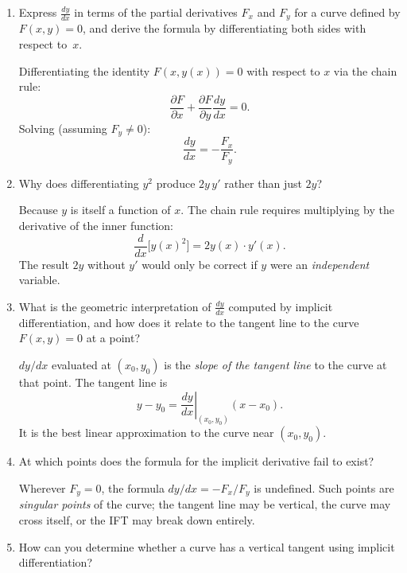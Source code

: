 \documentclass{self-check}
\begin{document}
\begin{enumerate}[leftmargin=*, itemsep=8pt]
    \begin{answer}
      Differentiate both sides with respect to \(x\), treating \(y\) as a function of \(x\):
      \[ 2x + 2y\,\frac{dy}{dx}= 0. \]
      Solving for \(dy/dx\) gives
      \[ \frac{dy}{dx}= -\frac{x}{y}. \]
    \end{answer}
  \item Express \(\frac{dy}{dx}\) in terms of the partial derivatives \(F_{x}\) and \(F_{y}\) for a curve defined by \(F(x,y)=0\), and derive the formula by differentiating both sides with respect to~\(x\).

    \begin{answer}
      Differentiating the identity \(F(x,y(x))=0\) with respect to \(x\) via the chain rule:
      \[ \frac{\partial F}{\partial x}+ \frac{\partial F}{\partial y}\frac{dy}{dx}= 0. \]
      Solving (assuming \(F_{y}\neq 0\)):
      \[ \frac{dy}{dx}= -\frac{F_{x}}{F_{y}}. \]
    \end{answer}
  \item Why does differentiating \(y^{2}\) produce \(2y\,y'\) rather than just \(2y\)?

    \begin{answer}
      Because \(y\) is itself a function of \(x\). The chain rule requires multiplying by the derivative of the inner function:
      \[ \frac{d}{dx}\bigl[y(x)^{2}\bigr] = 2y(x)\cdot y'(x). \]
      The result \(2y\) without \(y'\) would only be correct if \(y\) were an \emph{independent} variable.
    \end{answer}
  \item What is the geometric interpretation of \(\frac{dy}{dx}\) computed by implicit differentiation, and how does it relate to the tangent line to the curve \(F(x,y)=0\) at a point?

    \begin{answer}
      \(dy/dx\) evaluated at \((x_{0},y_{0})\) is the \emph{slope of the tangent line} to the curve at that point. The tangent line is
      \[ y - y_{0} = \left.\frac{dy}{dx}\right|_{(x_{0},y_{0})}(x-x_{0}). \]
      It is the best linear approximation to the curve near \((x_{0},y_{0})\).
    \end{answer}
  \item At which points does the formula for the implicit derivative fail to exist?

    \begin{answer}
      Wherever \(F_{y} = 0\), the formula \(dy/dx = -F_{x}/F_{y}\) is undefined. Such points are \emph{singular points} of the curve; the tangent line may be vertical, the curve may cross itself, or the IFT may break down entirely.
    \end{answer}
  \item How can you determine whether a curve has a vertical tangent using implicit differentiation?


\end{enumerate}
\end{document}
